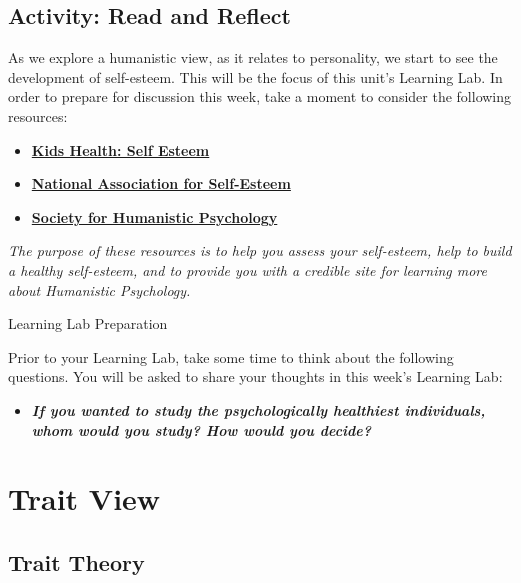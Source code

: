 \documentclass[
]{book}
\providecommand{\tightlist}{%
  \setlength{\itemsep}{0pt}\setlength{\parskip}{0pt}}
\begin{document}
\hypertarget{activity-read-and-reflect-3}{%
\subsection*{Activity: Read and Reflect}\label{activity-read-and-reflect-3}}

\begin{reflect}
As we explore a humanistic view, as it relates to personality, we start to see the development of self-esteem. This will be the focus of this unit's Learning Lab. In order to prepare for discussion this week, take a moment to consider the following resources:

\begin{itemize}
\tightlist
\item
  \href{https://kidshealth.org/en/kids/self-esteem.html}{\textbf{Kids Health: Self Esteem}}\\
\item
  \href{http://healthyselfesteem.org/}{\textbf{National Association for Self-Esteem}}\\
\item
  \href{https://www.apa.org/about/division/div32}{\textbf{Society for Humanistic Psychology}}
\end{itemize}

\emph{The purpose of these resources is to help you assess your self-esteem, help to build a healthy self-esteem, and to provide you with a credible site for learning more about Humanistic Psychology.}

{Learning Lab Preparation}

Prior to your Learning Lab, take some time to think about the following questions. You will be asked to share your thoughts in this week's Learning Lab:

\begin{itemize}
\tightlist
\item
  \textbf{\emph{If you wanted to study the psychologically healthiest individuals, whom would you study? How would you decide?}}
\end{itemize}
\end{reflect}

\hypertarget{trait-view}{%
\section{Trait View}\label{trait-view}}

\hypertarget{trait-theory}{%
\subsection*{Trait Theory}\label{trait-theory}}
\end{document}
